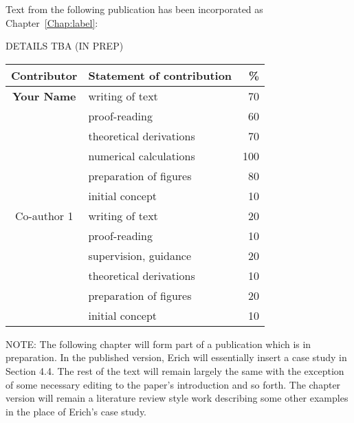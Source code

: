 \cleartoevenpage
\pagestyle{empty}	

\noindent
Text from the following publication has been incorporated as Chapter~\ref{Chap:label}:

\noindent
DETAILS TBA (IN PREP)

\begin{table}[h]
	\centering
	\begin{tabular}{clr}
		\toprule
		Contributor & Statement of contribution & \% \\
		\midrule
		\textbf{Your Name}				& writing of text 					& 70\\
															& proof-reading							& 60 \\
															& theoretical derivations 	& 70\\
															& numerical calculations 		& 100\\
															& preparation of figures 		& 80 \\
															& initial concept						& 10 \\
		\midrule
		Co-author 1								& writing of text 					& 20\\
															& proof-reading							& 10 \\
															& supervision, guidance 		& 20\\
															& theoretical derivations 	& 10\\
															& preparation of figures 		& 20 \\
															& initial concept						& 10 \\
		\bottomrule
	\end{tabular}
\end{table}

NOTE: The following chapter will form part of a publication which is in preparation. In the published version, Erich will essentially insert a case study in Section 4.4. The rest of the text will remain largely the same with the exception of some necessary editing to the paper's introduction and so forth. The chapter version will remain a literature review style work describing some other examples in the place of Erich's case study.



